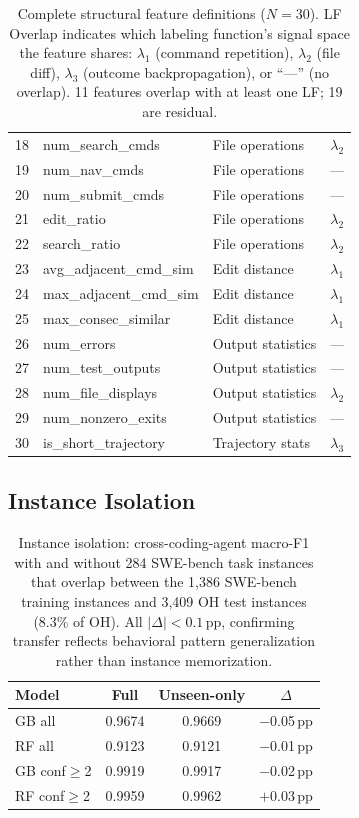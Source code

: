 \begin{table}[h]
\begin{tabular}{rlll}
18 & num\_search\_cmds      & File operations     & $\lambda_2$ \\
19 & num\_nav\_cmds         & File operations     & --- \\
20 & num\_submit\_cmds      & File operations     & --- \\
21 & edit\_ratio            & File operations     & $\lambda_2$ \\
22 & search\_ratio          & File operations     & $\lambda_2$ \\
23 & avg\_adjacent\_cmd\_sim & Edit distance       & $\lambda_1$ \\
24 & max\_adjacent\_cmd\_sim & Edit distance       & $\lambda_1$ \\
25 & max\_consec\_similar   & Edit distance       & $\lambda_1$ \\
26 & num\_errors            & Output statistics   & --- \\
27 & num\_test\_outputs     & Output statistics   & --- \\
28 & num\_file\_displays    & Output statistics   & $\lambda_2$ \\
29 & num\_nonzero\_exits    & Output statistics   & --- \\
30 & is\_short\_trajectory  & Trajectory stats    & $\lambda_3$ \\
\bottomrule
\end{tabular}
\caption{Complete structural feature definitions ($N{=}30$). LF Overlap indicates which labeling function's signal space the feature shares: $\lambda_1$ (command repetition), $\lambda_2$ (file diff), $\lambda_3$ (outcome backpropagation), or ``---'' (no overlap). 11 features overlap with at least one LF; 19 are residual.}
\label{tab:feature_defs}
\end{table}

\subsection{Instance Isolation}
\label{sec:app_instance_isolation}

\begin{table}[h]
\centering
\small
\begin{tabular}{lccc}
\toprule
\textbf{Model} & \textbf{Full} & \textbf{Unseen-only} & \textbf{$\Delta$} \\
\midrule
GB all & 0.9674 & 0.9669 & $-$0.05\,pp \\
RF all & 0.9123 & 0.9121 & $-$0.01\,pp \\
GB conf${\geq}$2 & 0.9919 & 0.9917 & $-$0.02\,pp \\
RF conf${\geq}$2 & 0.9959 & 0.9962 & $+$0.03\,pp \\
\bottomrule
\end{tabular}
\caption{Instance isolation: cross-coding-agent macro-F1 with and without 284 SWE-bench task instances that overlap between the 1,386 SWE-bench training instances and 3,409 OH test instances (8.3\% of OH). All $|\Delta| < 0.1$\,pp, confirming transfer reflects behavioral pattern generalization rather than instance memorization.}
\label{tab:instance_isolation}
\end{table}

